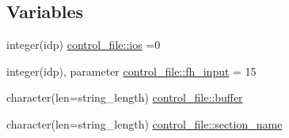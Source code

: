 \subsection*{Variables}
\begin{DoxyCompactItemize}
\item 
integer(idp) \hyperlink{namespacecontrol__file_a6853e365d1192ddeb155ff46b5eea846}{control\+\_\+file\+::ios} =0
\item 
integer(idp), parameter \hyperlink{namespacecontrol__file_a4d48196e76aeb5e34872568868ff74d4}{control\+\_\+file\+::fh\+\_\+input} = 15
\item 
character(len=string\+\_\+length) \hyperlink{namespacecontrol__file_af4db1abc89240a778d66ff2d097d5ba9}{control\+\_\+file\+::buffer}
\item 
character(len=string\+\_\+length) \hyperlink{namespacecontrol__file_ac0826d7eca56cce5d32c4333b55d3abb}{control\+\_\+file\+::section\+\_\+name}
\end{DoxyCompactItemize}
